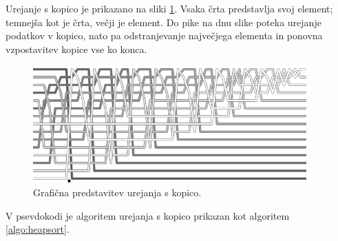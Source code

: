 \documentclass[a4paper,oneside,12pt]{article}
\begin{document}
Urejanje s kopico je prikazano na sliki \ref{fig:heapsortimage}.
Vsaka črta predstavlja svoj element; temnejša kot je črta, večji je element.
Do pike na dnu slike poteka urejanje podatkov v kopico, nato pa odstranjevanje
največjega elementa in ponovna vzpostavitev kopice vse ko konca.
\begin{figure}[h]
    \begin{center}
        \includegraphics[height=45mm]{slike/Heap.png}
    \end{center}
    \vspace{-0.7cm}
    \caption[Urejanje s kopico]{Grafična predstavitev urejanja s kopico.}
    \label{fig:heapsortimage}
\end{figure}

V psevdokodi je algoritem urejanja s kopico prikazan kot algoritem \ref{algo:heapsort}.
\end{document}
